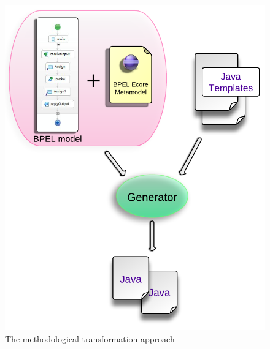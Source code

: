 \begin{figure}[h!]
  \begin{center}
    \includegraphics[scale=0.9]{pictures/TransformationApproach.png}
    \caption{The methodological transformation approach}
    \label{fig:TransformationApproach}
  \end{center}
\end{figure}